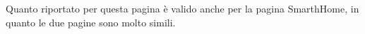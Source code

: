 Quanto riportato per questa pagina è valido anche per la pagina SmarthHome, in quanto le due pagine sono molto simili.